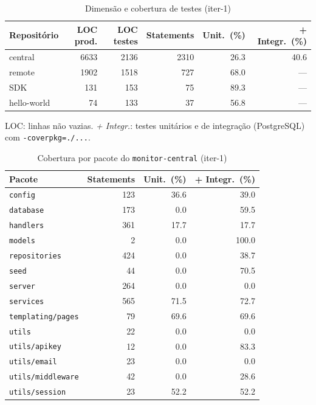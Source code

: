\begin{table}[htbp]
  \centering\small
  \caption{Dimensão e cobertura de testes (iter-1)}
  \label{tab:iter-1-cobertura}
  \begin{tabular}{lrrrrr}
    \toprule
    Repositório & LOC prod. & LOC testes & Statements & Unit.\ (\%) & + Integr.\ (\%) \\
    \midrule
    central & 6633 & 2136 & 2310 & 26.3 & 40.6 \\
    remote & 1902 & 1518 & 727 & 68.0 & --- \\
    SDK & 131 & 153 & 75 & 89.3 & --- \\
    hello-world & 74 & 133 & 37 & 56.8 & --- \\
    \bottomrule
  \end{tabular}
  \par\smallskip\footnotesize LOC: linhas não vazias. \emph{+ Integr.}: testes unitários e de integração (PostgreSQL) com \texttt{-coverpkg=./...}.
\end{table}

\begin{table}[htbp]
  \centering\small
  \caption{Cobertura por pacote do \texttt{monitor-central} (iter-1)}
  \label{tab:iter-1-cobertura-central}
  \begin{tabular}{lrrr}
    \toprule
    Pacote & Statements & Unit.\ (\%) & + Integr.\ (\%) \\
    \midrule
    \texttt{config} & 123 & 36.6 & 39.0 \\
    \texttt{database} & 173 & 0.0 & 59.5 \\
    \texttt{handlers} & 361 & 17.7 & 17.7 \\
    \texttt{models} & 2 & 0.0 & 100.0 \\
    \texttt{repositories} & 424 & 0.0 & 38.7 \\
    \texttt{seed} & 44 & 0.0 & 70.5 \\
    \texttt{server} & 264 & 0.0 & 0.0 \\
    \texttt{services} & 565 & 71.5 & 72.7 \\
    \texttt{templating/pages} & 79 & 69.6 & 69.6 \\
    \texttt{utils} & 22 & 0.0 & 0.0 \\
    \texttt{utils/apikey} & 12 & 0.0 & 83.3 \\
    \texttt{utils/email} & 23 & 0.0 & 0.0 \\
    \texttt{utils/middleware} & 42 & 0.0 & 28.6 \\
    \texttt{utils/session} & 23 & 52.2 & 52.2 \\
    \bottomrule
  \end{tabular}
\end{table}
